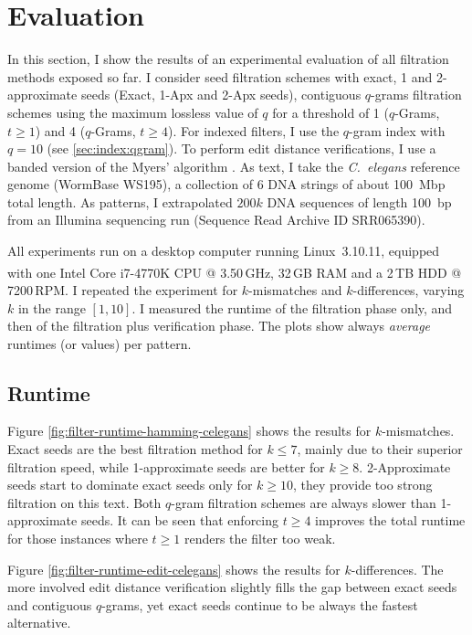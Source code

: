 \section{Evaluation}
\label{sec:filtering:evaluation}

In this section, I show the results of an experimental evaluation of all filtration methods exposed so far.
I consider seed filtration schemes with exact, 1 and 2-approximate seeds (Exact, 1-Apx and 2-Apx seeds), contiguous $q$-grams filtration schemes using the maximum lossless value of $q$ for a threshold of 1 ($q$-Grams, $t \geq 1$) and 4 ($q$-Grams, $t \geq 4$).
For indexed filters, I use the $q$-gram index with $q=10$ (see \ref{sec:index:qgram}).
To perform edit distance verifications, I use a banded version of the Myers' algorithm \citep{Myers1999}.
As text, I take the \emph{C.~elegans} reference genome (WormBase WS195), \ie a collection of 6 DNA strings of about 100~Mbp total length.
As patterns, I extrapolated $200k$ DNA sequences of length 100~bp from an Illumina sequencing run (Sequence Read Archive ID SRR065390).

All experiments run on a desktop computer running Linux~3.10.11, equipped with one Intel\textsuperscript{\textregistered} Core i7-4770K CPU @ 3.50\,GHz, 32\,GB RAM and a 2\,TB HDD @ 7200\,RPM.
I repeated the experiment for $k$-mismatches and $k$-differences, varying $k$ in the range $[1,10]$.
I measured the runtime of the filtration phase only, and then of the filtration plus verification phase.
The plots show always \emph{average} runtimes (or values) per pattern.

\subsection{Runtime}

Figure \ref{fig:filter-runtime-hamming-celegans} shows the results for $k$-mismatches.
Exact seeds are the best filtration method for $k \leq 7$, mainly due to their superior filtration speed, while 1-approximate seeds are better for $k \geq 8$.
2-Approximate seeds start to dominate exact seeds only for $k \geq 10$, \ie they provide too strong filtration on this text.
Both $q$-gram filtration schemes are always slower than 1-approximate seeds.
It can be seen that enforcing $t \geq 4$ improves the total runtime for those instances where $t \geq 1$ renders the filter too weak.

Figure \ref{fig:filter-runtime-edit-celegans} shows the results for $k$-differences.
The more involved edit distance verification slightly fills the gap between exact seeds and contiguous $q$-grams, yet exact seeds continue to be always the fastest alternative.

